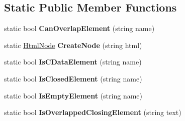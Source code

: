 \subsection*{Static Public Member Functions}
\begin{DoxyCompactItemize}
\item 
\mbox{\label{class_html_agility_pack_1_1_html_node_a2d50cc5b57ea2c85a032cc064bde24d2}} 
static bool {\bfseries Can\+Overlap\+Element} (string name)
\item 
\mbox{\label{class_html_agility_pack_1_1_html_node_ab6a41df0b0ebcc6af2c39524119f5dfd}} 
static \hyperlink{class_html_agility_pack_1_1_html_node}{Html\+Node} {\bfseries Create\+Node} (string html)
\item 
\mbox{\label{class_html_agility_pack_1_1_html_node_af33dfb76cce8949302d5f462cd85390f}} 
static bool {\bfseries Is\+C\+Data\+Element} (string name)
\item 
\mbox{\label{class_html_agility_pack_1_1_html_node_a1fcd4753675ee688b1d198c27fffcdac}} 
static bool {\bfseries Is\+Closed\+Element} (string name)
\item 
\mbox{\label{class_html_agility_pack_1_1_html_node_a291043d73de281deda489ca6ef8b3235}} 
static bool {\bfseries Is\+Empty\+Element} (string name)
\item 
\mbox{\label{class_html_agility_pack_1_1_html_node_ab5eb05dddf6f617bbfd64e9ab8b8d8c7}} 
static bool {\bfseries Is\+Overlapped\+Closing\+Element} (string text)
\end{DoxyCompactItemize}
